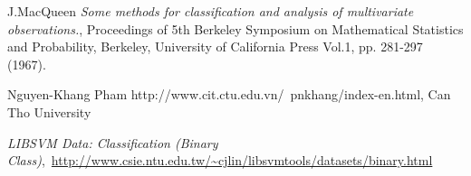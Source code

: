 \begin{thebibliography}{99}
 J.MacQueen \emph{Some methods for classification and analysis of multivariate observations.}, Proceedings of 5th Berkeley Symposium on Mathematical Statistics and Probability, Berkeley, University of California Press Vol.1, pp. 281-297 (1967).

 Nguyen-Khang Pham http://www.cit.ctu.edu.vn/~pnkhang/index-en.html, Can Tho University

\emph{LIBSVM Data: Classification (Binary Class)},\ \url{http://www.csie.ntu.edu.tw/~cjlin/libsvmtools/datasets/binary.html}



\end{thebibliography}
